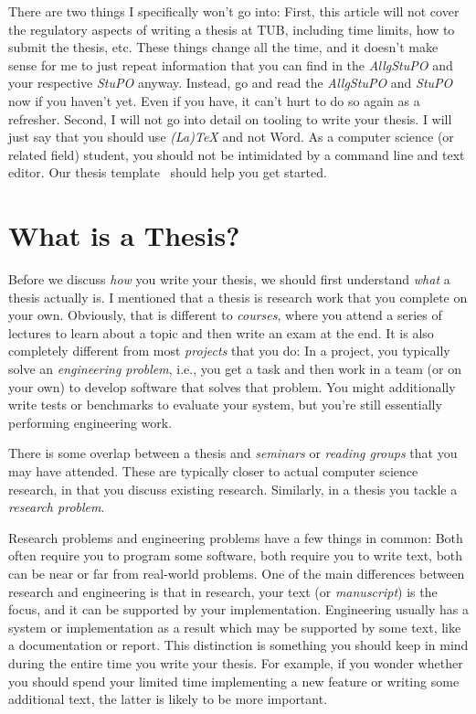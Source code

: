 \documentclass[a4]{article}
\begin{document}
There are two things I specifically won't go into:
First, this article will not cover the regulatory aspects of writing a thesis at TUB, including time limits, how to submit the thesis, etc.
These things change all the time, and it doesn't make sense for me to just repeat information that you can find in the \emph{AllgStuPO} and your respective \emph{StuPO} anyway.
Instead, go and read the \emph{AllgStuPO} and \emph{StuPO} now if you haven't yet.
Even if you have, it can't hurt to do so again as a refresher.
Second, I will not go into detail on tooling to write your thesis.
I will just say that you should use \emph{(La)TeX} and not Word.
As a computer science (or related field) student, you should not be intimidated by a command line and text editor.
Our thesis template~\cite{thesis-template} should help you get started.

\section{What is a Thesis?}
\label{sec:what}

Before we discuss \emph{how} you write your thesis, we should first understand \emph{what} a thesis actually is.
I mentioned that a thesis is research work that you complete on your own.
Obviously, that is different to \emph{courses}, where you attend a series of lectures to learn about a topic and then write an exam at the end.
It is also completely different from most \emph{projects} that you do:
In a project, you typically solve an \emph{engineering problem}, i.e., you get a task and then work in a team (or on your own) to develop software that solves that problem.
You might additionally write tests or benchmarks to evaluate your system, but you're still essentially performing engineering work.

There is some overlap between a thesis and \emph{seminars} or \emph{reading groups} that you may have attended.
These are typically closer to actual computer science research, in that you discuss existing research.
Similarly, in a thesis you tackle a \emph{research problem}.

Research problems and engineering problems have a few things in common:
Both often require you to program some software, both require you to write text, both can be near or far from real-world problems.
One of the main differences between research and engineering is that in research, your text (or \emph{manuscript}) is the focus, and it can be supported by your implementation.
Engineering usually has a system or implementation as a result which may be supported by some text, like a documentation or report.
This distinction is something you should keep in mind during the entire time you write your thesis.
For example, if you wonder whether you should spend your limited time implementing a new feature or writing some additional text, the latter is likely to be more important.
\end{document}
